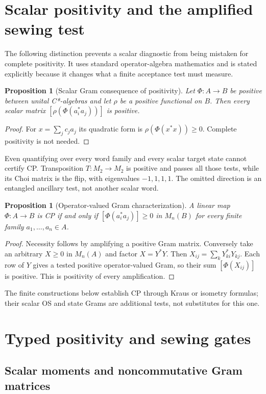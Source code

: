 \documentclass[11pt,a4paper]{article}
\newtheorem{proposition}[theorem]{Proposition}
\theoremstyle{definition}
\theoremstyle{remark}
\begin{document}
\section{Scalar positivity and the amplified sewing test}
The following distinction prevents a scalar diagnostic from being mistaken for
complete positivity. It uses standard operator-algebra mathematics and is stated
explicitly because it changes what a finite acceptance test must measure.
\begin{proposition}[Scalar Gram consequence of positivity]
Let $\Phi:A\to B$ be positive between unital C*-algebras and let $\rho$ be a positive
functional on $B$. Then every scalar matrix $[\rho(\Phi(a_i^*a_j))]$ is positive.
\end{proposition}
\begin{proof}
For $x=\sum_jc_ja_j$ its quadratic form is $\rho(\Phi(x^*x))\geq0$.
Complete positivity is not needed.
\end{proof}
Even quantifying over every word family and every scalar target state cannot
certify CP. Transposition $T:M_2\to M_2$ is positive and passes all those tests,
while its Choi matrix is the flip, with eigenvalues $-1,1,1,1$.
The omitted direction is an entangled ancillary test, not another scalar word.
\begin{proposition}[Operator-valued Gram characterization]
A linear map $\Phi:A\to B$ is CP if and only if
$[\Phi(a_i^*a_j)]\geq0$ in $M_n(B)$ for every finite family $a_1,\ldots,a_n\in A$.
\end{proposition}
\begin{proof}
Necessity follows by amplifying a positive Gram matrix. Conversely take an
arbitrary $X\geq0$ in $M_n(A)$ and factor $X=Y^*Y$. Then
$X_{ij}=\sum_kY_{ki}^*Y_{kj}$. Each row of $Y$ gives a tested positive
operator-valued Gram, so their sum $[\Phi(X_{ij})]$ is positive. This is positivity
of every amplification.
\end{proof}
The finite constructions below establish CP through Kraus or isometry formulas;
their scalar OS and state Grams are additional tests, not substitutes for this one.

\section{Typed positivity and sewing gates}
\label{sec:gates}

\subsection{Scalar moments and noncommutative Gram matrices}
\end{document}
